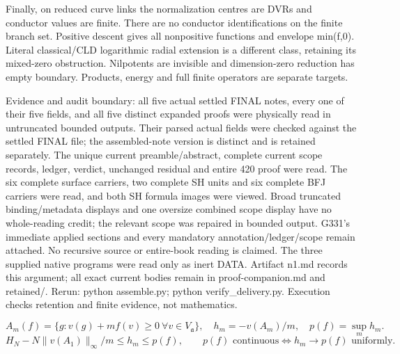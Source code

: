 Finally, on reduced curve links the normalization centres are DVRs and conductor values are finite. There are no conductor identifications on the finite branch set. Positive descent gives all nonpositive functions and envelope min(f,0). Literal classical/CLD logarithmic radial extension is a different class, retaining its mixed-zero obstruction. Nilpotents are invisible and dimension-zero reduction has empty boundary. Products, energy and full finite operators are separate targets.

Evidence and audit boundary: all five actual settled FINAL notes, every one of their five fields, and all five distinct expanded proofs were physically read in untruncated bounded outputs. Their parsed actual fields were checked against the settled FINAL file; the assembled-note version is distinct and is retained separately. The unique current preamble/abstract, complete current scope records, ledger, verdict, unchanged residual and entire 420 proof were read. The six complete surface carriers, two complete SH units and six complete BFJ carriers were read, and both SH formula images were viewed. Broad truncated binding/metadata displays and one oversize combined scope display have no whole-reading credit; the relevant scope was repaired in bounded output. G331's immediate applied sections and every mandatory annotation/ledger/scope remain attached. No recursive source or entire-book reading is claimed. The three supplied native programs were read only as inert DATA. Artifact n1.md records this argument; all exact current bodies remain in proof-companion.md and retained/. Rerun: python assemble.py; python verify\_delivery.py. Execution checks retention and finite evidence, not mathematics.

\[
 A_m(f)=\{g:v(g)+mf(v)\ge0\ \forall v\in V_{\mathfrak a}\},\quad
 h_m=-v(A_m)/m,\quad p(f)=\sup_m h_m.
\]
\[
 H_N-N\|v(A_1)\|_\infty/m\le h_m\le p(f),\qquad
 p(f)\text{ continuous}\Longleftrightarrow h_m\to p(f)\text{ uniformly}.
\]

